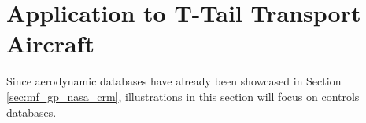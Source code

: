 \section{Application to T-Tail Transport Aircraft}

Since aerodynamic databases have already been showcased in Section \ref{sec:mf_gp_nasa_crm}, illustrations in this section will focus on controls databases. 